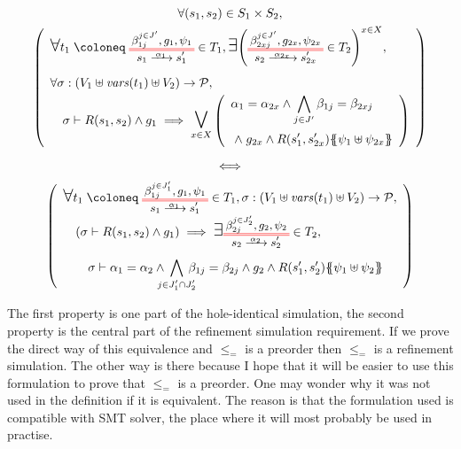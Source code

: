 \documentclass{article}
\begin{document}
\begin{lem}
\begin{gather*}
\forall \mpar{s_1, s_2} \in S_1 \times S_2, \\
\mpar{\everymath{\displaystyle}\begin{array}{l}
	\bigsymb{\forall} t_1 \defobject \OTx{1}{}{1}{} \in T_1, \bigsymb{\exists} \mpar{\OTx{2}{x}{2x}{} \in T_2}^{x \in X}, \\[12pt]
	\forall \sigma: \mpar{V_1 \uplus \fvars{t_1} \uplus V_2} \to \values, \\
	\quad \sigma \vdash R\mpar{s_1, s_2} \wedge g_1 \implies \operatorname*{\bigsymb{\bigvee}}_{x \in X} \mpar{\begin{array}{l}
		\alpha_1 = \alpha_{2x} \wedge \bigwedge_{j \in J'} \beta_{1j} = \beta_{2xj} \\[12pt]
		\nwedge g_{2x} \wedge R\mpar{s'_1, s'_{2x}}\psubst{\psi_1 \uplus \psi_{2x}}
	\end{array}}
\end{array}} \\
\iff \\
\mpar{\everymath{\displaystyle}\begin{array}{l}
	\bigsymb{\forall} t_1 \defobject \OTx{1}{}{1}{1} \in T_1, \sigma: \mpar{V_1 \uplus \fvars{t_1} \uplus V_2} \to \values, \\[6pt]
	\quad \mpar{\sigma \vdash R\mpar{s_1, s_2} \wedge g_1} \implies \bigsymb{\exists} \OTx{2}{}{2}{2} \in T_2, \\[12pt]
	\qquad \sigma \vdash \alpha_1 = \alpha_2 \wedge \bigwedge_\subbox{j \in J'_1 \cap J'_2} \beta_{1j} = \beta_{2j} \wedge g_2 \wedge R\mpar{s'_1, s'_2}\psubst{\psi_1 \uplus \psi_2}
\end{array}}
\end{gather*}
\end{lem}
The first property is one part of the hole-identical simulation, the second property is the central part of the refinement simulation requirement.
If we prove the direct way of this equivalence and \(\leq_=\) is a preorder then \(\leq_=\) is a refinement simulation.
The other way is there because I hope that it will be easier to use this formulation to prove that \(\leq_=\) is a preorder. %
One may wonder why it was not used in the definition if it is equivalent.
The reason is that the formulation used is compatible with SMT solver, the place where it will most probably be used in practise.
\end{document}
